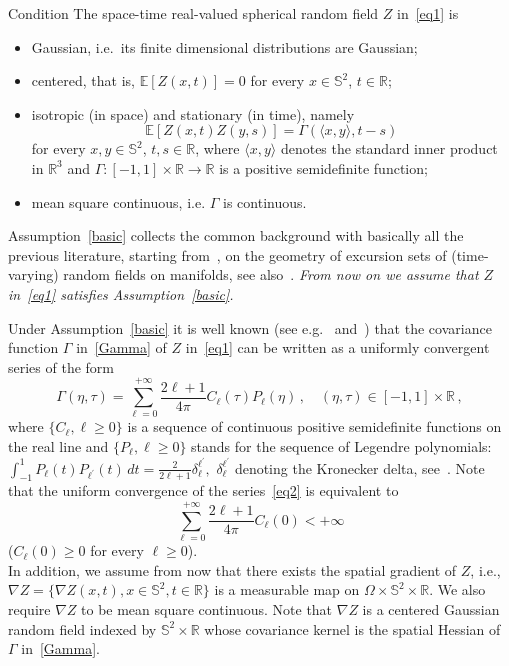 \documentclass[10pt]{amsart}
\theoremstyle{definition}\newtheorem{defi}[theo]{Definition}\newtheorem{rema}[theo]{Remark}\newtheorem{exam}[theo]{Example}\newtheorem{exem}[theo]{Example}\newtheorem{nota}[theo]{Notation}
\newcommand{\bbS}{\mathbb{S}}
\newcommand{\bbR}{\mathbb{R}}
\newcommand{\bbE}{\mathbb{E}}
\begin{document}
\begin{enonce}{Condition}\label{basic}
The space-time real-valued spherical random field $Z$ in~\eqref{eq1} is
\begin{itemize}
\item Gaussian, i.e.~its finite dimensional distributions are Gaussian;

\item centered, that is, $\bbE[Z(x,t)] = 0$ for every $x\in \bbS ^2$, $t\in \bbR$;

\item isotropic (in space) and stationary (in time), namely
\begin{equation}\label{Gamma}
\bbE[Z(x,t) Z(y,s)] = \Gamma(\langle x,y\rangle, t-s)
\end{equation}
for every $x,y\in \bbS^2$, $t,s \in \bbR$, where $\langle x, y\rangle$ denotes the standard inner product in $\bbR^3$ and $
\Gamma:[-1,1]\times \bbR\to \bbR$ is a positive semidefinite function;

\item mean square continuous, i.e. $\Gamma$ is continuous.
\end{itemize}
\end{enonce}

Assumption~\ref{basic} collects the common background with basically all the previous literature, starting from~\cite{adlertaylor}, on the geometry of excursion sets of (time-varying) random fields on manifolds, see also~\cite {BP17, LO13, MRV:20}. \emph{From now on we assume that $Z$ in~\eqref{eq1} satisfies Assumption~\ref{basic}.}

Under Assumption~\ref{basic} it is well known (see e.g.~\cite[Theorem~3.3] {BP17} and~\cite[Theorem~3]{MM18}) that the covariance function $\Gamma$ in~\eqref{Gamma} of $Z$ in~\eqref{eq1} can be written as a uniformly convergent series of the form
\begin{equation}\label{eq2}
\Gamma(\eta, \tau) = \sum_{\ell=0}^{+\infty} \frac{2\ell+1}{4\pi} C_\ell(\tau) P_\ell(\eta)\,,\quad (\eta, \tau) \in [-1,1] \times \bbR
\,,
\end{equation}
where $\{ C_\ell, \ell\ge 0\}$ is a sequence of continuous positive semidefinite functions on the real line and $\{ P_\ell,
\ell\ge 0\}$ stands for the sequence of Legendre polynomials: $
\int_{-1}^1 P_{\ell}(t) P_{\ell^{\prime }}(t)\,dt= \frac{2}{2\ell+1}
\delta_{\ell}^{\ell^{\prime }}, $ $\delta_{\ell}^{\ell^{\prime }}$ denoting the Kronecker delta, see~\cite[Section~4.7]{Sze75}. Note that the uniform convergence of the series~\eqref{eq2} is equivalent to
\begin{equation*}
\sum_{\ell = 0}^{+\infty} \frac{2\ell+1}{4\pi} C_\ell(0) < +\infty
\end{equation*}
($C_\ell(0)\ge 0$ for every $\ell\ge 0$). \\
In addition, we assume from now that there exists the spatial gradient of $Z$, i.e., $\nabla Z = \{ \nabla Z(x,t), x\in \bbS^2, t\in \bbR\}$ is a measurable map on $\Omega\times \bbS^2\times \bbR$. We also require $\nabla Z$ to be mean square continuous. Note that $
\nabla Z $ is a centered Gaussian random field indexed by $\bbS^2\times \bbR $ whose covariance kernel is the spatial Hessian of $\Gamma$ in~\eqref{Gamma}.
\end{document}
